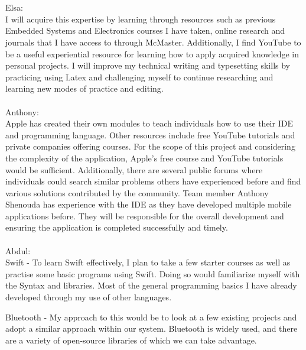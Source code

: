 \documentclass[12pt]{article}
\begin{document}
\begin{enumerate}
\\
\\
Elsa:
\\ 
  I will acquire this expertise by learning through resources such as previous Embedded Systems and Electronics courses I have taken, online research and journals that I have access to through McMaster.  Additionally, I find YouTube to be a useful experiential resource for learning how to apply acquired knowledge in personal projects.  I will improve my technical writing and typesetting skills by practicing using Latex and challenging myself to continue researching and learning new modes of practice and editing.
\\
\\
Anthony:
\\ 
Apple has created their own modules to teach individuals how to use their IDE and programming language. Other resources include free YouTube tutorials and private companies offering courses. For the scope of this project and considering the complexity of the application, Apple’s free course and YouTube tutorials would be sufficient. Additionally, there are several public forums where individuals could search similar problems others have experienced before and find various solutions contributed by the community. Team member Anthony Shenouda has experience with the IDE as they have developed multiple mobile applications before. They will be responsible for the overall development and ensuring the application is completed successfully and timely. 
\\
\\
Abdul:
\\ 
 Swift -  To learn Swift effectively, I plan to take a few starter courses as well as practise some basic programs using Swift. Doing so would familiarize myself with the Syntax and libraries. Most of the general programming basics I have already developed through my use of other languages. 
  
 Bluetooth - My approach to this would be to look at a few existing projects and adopt a similar approach within our system. Bluetooth is widely used, and there are a variety of open-source libraries of which we can take advantage.
\end{enumerate}
\end{document}
